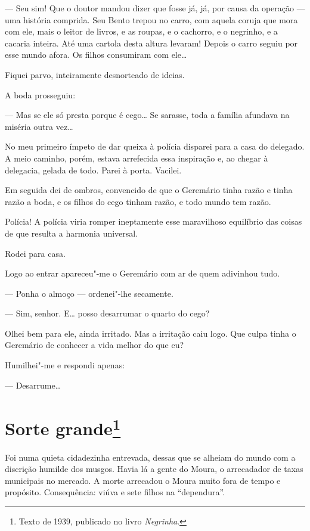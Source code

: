 --- Seu sim! Que o doutor mandou dizer que fosse já, já, por causa da
operação --- uma história comprida. Seu Bento trepou no carro, com
aquela coruja que mora com ele, mais o leitor de livros, e as roupas, e
o cachorro, e o negrinho, e a cacaria inteira. Até uma cartola desta
altura levaram! Depois o carro seguiu por esse mundo afora. Os filhos
consumiram com ele\ldots{}

Fiquei parvo, inteiramente desnorteado de ideias.

A boda prosseguiu:

--- Mas se ele só presta porque é cego\ldots{} Se sarasse, toda a família
afundava na miséria outra vez\ldots{}

No meu primeiro ímpeto de dar queixa à polícia disparei para a casa do
delegado. A meio caminho, porém, estava arrefecida essa inspiração e, ao
chegar à delegacia, gelada de todo. Parei à porta. Vacilei.

Em seguida dei de ombros, convencido de que o Geremário tinha razão e
tinha razão a boda, e os filhos do cego tinham razão, e todo mundo tem
razão.

Polícia! A polícia viria romper ineptamente esse maravilhoso equilíbrio
das coisas de que resulta a harmonia universal.

Rodei para casa.

Logo ao entrar apareceu"-me o Geremário com ar de quem adivinhou tudo.

--- Ponha o almoço --- ordenei"-lhe secamente.

--- Sim, senhor. E\ldots{} posso desarrumar o quarto do cego?

Olhei bem para ele, ainda irritado. Mas a irritação caiu logo. Que culpa
tinha o Geremário de conhecer a vida melhor do que eu?

Humilhei"-me e respondi apenas:

--- Desarrume\ldots{}

\chapter{Sorte grande\footnote[*]{Texto de 1939, publicado no livro \emph{Negrinha}.}}

Foi numa quieta cidadezinha entrevada, dessas que se alheiam do mundo
com a discrição humilde dos musgos. Havia lá a gente do Moura, o
arrecadador de taxas municipais no mercado. A morte arrecadou o Moura
muito fora de tempo e propósito. Consequência: viúva e sete filhos na
``dependura''.

